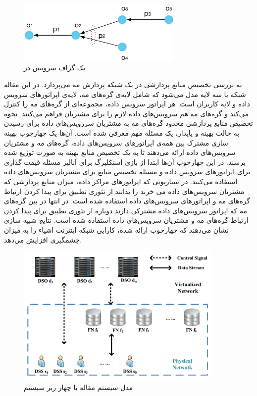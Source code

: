     \begin{figure}[h]
      \centerline{\includegraphics[width=8cm]{graphics/chapter_2/service_graph_barcelo2016iot}}
      \caption{یک گراف سرویس در \cite{barcelo2016iot}}
      \label{fig:chapter_2:service_graph_barcelo2016iot}
    \end{figure}

    \cite{zhang2017computing} به بررسی تخصیص منابع پردازشی در یک شبکه پردازش مه می‌پردازد.
    در این مقاله شبکه با سه لایه مدل می‌شود که شامل لایه‌ی گره‌های مه، لایه‌ی اپراتور‌های سرویس داده و لایه کاربران است.
    هر اپراتور سرویس داده، مجموعه‌ای از گره‌های مه را کنترل می‌کند و گره‌های مه هم سرویس‌های داده لازم را برای مشتریان فراهم می‌کنند.
    نحوه تخصیص منابع پردازشی محدود گره‌های مه به مشتریان سررویس‌های داده برای رسیدن به حالت بهینه و پایدار، یک مسئله مهم معرفی شده است.
    آن‌ها یک چهارچوب بهینه سازی مشترک بین همه‌ی اپراتور‌های سرویس‌های داده، گره‌های مه و مشتریان سرویس‌های داده ارائه می‌دهند تا به یک تخصیص منابع بهینه به صورت توزیع شده برسند.
    در این چهارچوب آن‌‌ها ابتدا از بازی استکلبرگ برای آنالیز مسئله قیمت گذاری برای اپراتور‌های سرویس داده و مسئله تخصیص منابع برای مشتریان سرویس‌های داده استفاده می‌کنند.
    در سناریویی که اپراتور‌های مراکز داده، میزان منابع پردازشی که مشتریان سرویس‌های داده می خرند را بدانند از تئوری تطبیق برای پیدا کردن ارتباط گره‌های مه و اپراتور‌های سرویس‌های داده استفاده شده است.
    در انتها در بین گره‌های مه که اپراتور سرویس‌های داده مشترکی دارند دوباره از تئوری تطبیق برای پیدا کردن ارتباط گره‌های مه و مشتریان سرویس‌های داده استفاده شده است.
    نتایج شبیه سازی نشان می‌دهند که چهارچوب ارائه شده، کارایی شبکه اینترنت اشیاء را به میزان چشمگیری افزایش می‌دهد.

    \begin{figure}[h]
      \centerline{\includegraphics[width=10cm]{graphics/chapter_2/system_model_zhang2017computing}}
      \caption{مدل سیستم مقاله \cite{zhang2017computing} با چهار زیر سیستم}
      \label{fig:chapter_2:system_model_zhang2017computing}
    \end{figure}


